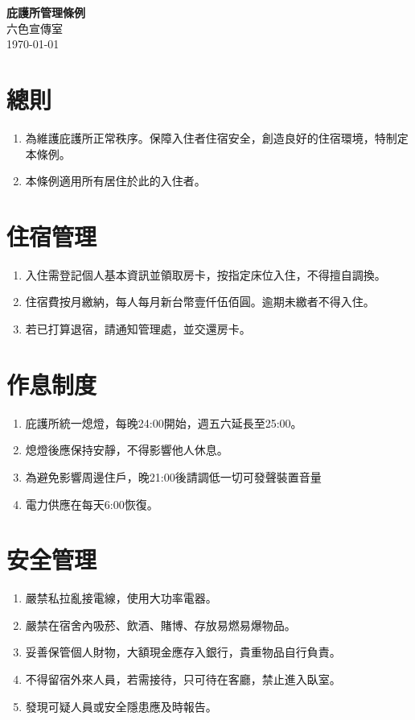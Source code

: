 \documentclass[12pt]{article}
\begin{document}
\allsectionsfont{\sffamily}
\begin{center}
	\huge\textsf{\textbf{庇護所管理條例}}\\
	\vspace{0.5cm}
	\normalsize 六色宣傳室\\
	\vspace{0.25cm}
	\today
\end{center}

\section{總則}
\begin{enumerate}
    \item 為維護庇護所正常秩序。保障入住者住宿安全，創造良好的住宿環境，特制定本條例。
    \item 本條例適用所有居住於此的入住者。
\end{enumerate}

\section{住宿管理}
\begin{enumerate}
	\item 入住需登記個人基本資訊並領取房卡，按指定床位入住，不得擅自調換。
	\item 住宿費按月繳納，每人每月新台幣壹仟伍佰圓。逾期未繳者不得入住。%
	\item 若已打算退宿，請通知管理處，並交還房卡。
\end{enumerate}

\section{作息制度}
\begin{enumerate}
	\item 庇護所統一熄燈，每晚24:00開始，週五六延長至25:00。
	\item 熄燈後應保持安靜，不得影響他人休息。
	\item 為避免影響周邊住戶，晚21:00後請調低一切可發聲裝置音量
	\item 電力供應在每天6:00恢復。
\end{enumerate}

\section{安全管理}
\begin{enumerate}
	\item 嚴禁私拉亂接電線，使用大功率電器。
	\item 嚴禁在宿舍內吸菸、飲酒、賭博、存放易燃易爆物品。
	\item 妥善保管個人財物，大額現金應存入銀行，貴重物品自行負責。
	\item 不得留宿外來人員，若需接待，只可待在客廳，禁止進入臥室。
	\item 發現可疑人員或安全隱患應及時報告。
\end{enumerate}
\end{document}
